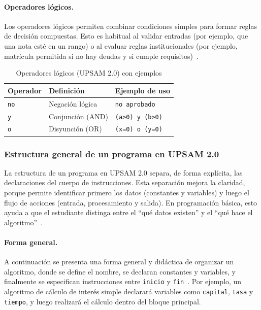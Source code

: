 \documentclass[12pt,twoside]{book}
\begin{document}
						\paragraph{Operadores lógicos.}
							Los operadores lógicos permiten combinar condiciones simples para formar reglas de decisión compuestas. Esto es habitual al validar entradas (por ejemplo, que una nota esté en un rango) o al evaluar reglas institucionales (por ejemplo, matrícula permitida si no hay deudas y si cumple requisitos)~\cite{Sebesta2018Concepts,Gaddis2022Starting,Farrell2018Programming}.
							
							\begin{table}[h]
								\centering
								\caption{Operadores lógicos (UPSAM 2.0) con ejemplos}
								\label{tab:upsam_op_log}
								\begin{tabular}{lll}
									\hline
									\textbf{Operador} & \textbf{Definición} & \textbf{Ejemplo de uso} \\
									\hline
									\texttt{no} & Negación lógica & \texttt{no aprobado} \\
									\texttt{y} & Conjunción (AND) & \texttt{(a>0) y (b>0)} \\
									\texttt{o} & Disyunción (OR) & \texttt{(x=0) o (y=0)} \\
									\hline
								\end{tabular}
							\end{table}
							
					\subsubsection{Estructura general de un programa en UPSAM 2.0}
						\label{sec:estructuraAlgoritmo}
						\noindent
						La estructura de un programa en UPSAM 2.0 separa, de forma explícita, las declaraciones del cuerpo de instrucciones. Esta separación mejora la claridad, porque permite identificar primero los datos (constantes y variables) y luego el flujo de acciones (entrada, procesamiento y salida). En programación básica, esto ayuda a que el estudiante distinga entre el ``qué datos existen'' y el ``qué hace el algoritmo''~\cite{Joyanes2007Fundamentos}.
						
						\paragraph{Forma general.}
							A continuación se presenta una forma general y didáctica de organizar un algoritmo, donde se define el nombre, se declaran constantes y variables, y finalmente se especifican instrucciones entre \texttt{inicio} y \texttt{fin}~\cite{Joyanes2007Fundamentos}. Por ejemplo, un algoritmo de cálculo de interés simple declarará variables como \texttt{capital}, \texttt{tasa} y \texttt{tiempo}, y luego realizará el cálculo dentro del bloque principal.
							
\end{document}
